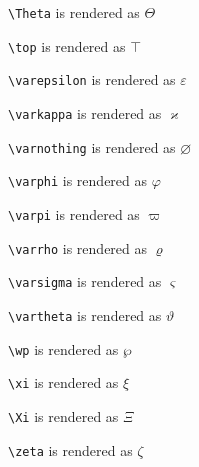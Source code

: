 \texttt{\textbackslash Theta} is rendered as $\Theta$


\texttt{\textbackslash top} is rendered as $\top$


\texttt{\textbackslash varepsilon} is rendered as $\varepsilon$


\texttt{\textbackslash varkappa} is rendered as $\varkappa$


\texttt{\textbackslash varnothing} is rendered as $\varnothing$


\texttt{\textbackslash varphi} is rendered as $\varphi$


\texttt{\textbackslash varpi} is rendered as $\varpi$


\texttt{\textbackslash varrho} is rendered as $\varrho$


\texttt{\textbackslash varsigma} is rendered as $\varsigma$


\texttt{\textbackslash vartheta} is rendered as $\vartheta$


\texttt{\textbackslash wp} is rendered as $\wp$


\texttt{\textbackslash xi} is rendered as $\xi$


\texttt{\textbackslash Xi} is rendered as $\Xi$


\texttt{\textbackslash zeta} is rendered as $\zeta$

